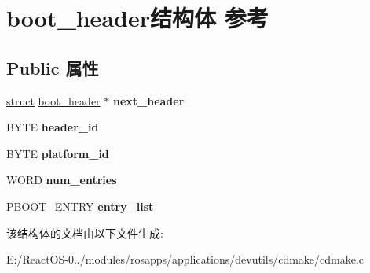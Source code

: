 \hypertarget{structboot__header}{}\section{boot\+\_\+header结构体 参考}
\label{structboot__header}
\subsection*{Public 属性}
\begin{DoxyCompactItemize}
\item 
\mbox{\label{structboot__header_ab85a299fe4e1ebba0ed2d4c3902356b5}} 
\hyperlink{interfacestruct}{struct} \hyperlink{structboot__header}{boot\+\_\+header} $\ast$ {\bfseries next\+\_\+header}
\item 
\mbox{\label{structboot__header_a79e640bb1858b3a4e2d5ccc62eea988b}} 
B\+Y\+TE {\bfseries header\+\_\+id}
\item 
\mbox{\label{structboot__header_ae6c5bb636058f7a563a90d9a15e52153}} 
B\+Y\+TE {\bfseries platform\+\_\+id}
\item 
\mbox{\label{structboot__header_a68419de133388e4d735d532a458896c2}} 
W\+O\+RD {\bfseries num\+\_\+entries}
\item 
\mbox{\label{structboot__header_a46a957bc397adb518df89303a1f363d9}} 
\hyperlink{structboot__entry}{P\+B\+O\+O\+T\+\_\+\+E\+N\+T\+RY} {\bfseries entry\+\_\+list}
\end{DoxyCompactItemize}


该结构体的文档由以下文件生成\+:\begin{DoxyCompactItemize}
\item 
E\+:/\+React\+O\+S-\/0../modules/rosapps/applications/devutils/cdmake/cdmake.\+c\end{DoxyCompactItemize}
